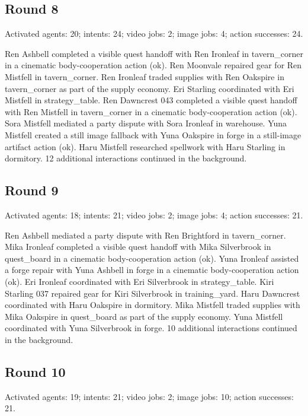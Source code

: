 \documentclass[11pt,a4paper]{article}
\begin{document}
\subsection{Round 8}
Activated agents: 20; intents: 24; video jobs: 2; image jobs: 4; action successes: 24.

Ren Ashbell completed a visible quest handoff with Ren Ironleaf in tavern\_corner in a cinematic body-cooperation action (ok). Ren Moonvale repaired gear for Ren Mistfell in tavern\_corner. Ren Ironleaf traded supplies with Ren Oakspire in tavern\_corner as part of the supply economy. Eri Starling coordinated with Eri Mistfell in strategy\_table. Ren Dawncrest 043 completed a visible quest handoff with Ren Mistfell in tavern\_corner in a cinematic body-cooperation action (ok). Sora Mistfell mediated a party dispute with Sora Ironleaf in warehouse. Yuna Mistfell created a still image fallback with Yuna Oakspire in forge in a still-image artifact action (ok). Haru Mistfell researched spellwork with Haru Starling in dormitory. 12 additional interactions continued in the background.

\subsection{Round 9}
Activated agents: 18; intents: 21; video jobs: 2; image jobs: 4; action successes: 21.

Ren Ashbell mediated a party dispute with Ren Brightford in tavern\_corner. Mika Ironleaf completed a visible quest handoff with Mika Silverbrook in quest\_board in a cinematic body-cooperation action (ok). Yuna Ironleaf assisted a forge repair with Yuna Ashbell in forge in a cinematic body-cooperation action (ok). Eri Ironleaf coordinated with Eri Silverbrook in strategy\_table. Kiri Starling 037 repaired gear for Kiri Silverbrook in training\_yard. Haru Dawncrest coordinated with Haru Oakspire in dormitory. Mika Mistfell traded supplies with Mika Oakspire in quest\_board as part of the supply economy. Yuna Mistfell coordinated with Yuna Silverbrook in forge. 10 additional interactions continued in the background.

\subsection{Round 10}
Activated agents: 19; intents: 21; video jobs: 2; image jobs: 10; action successes: 21.
\end{document}

